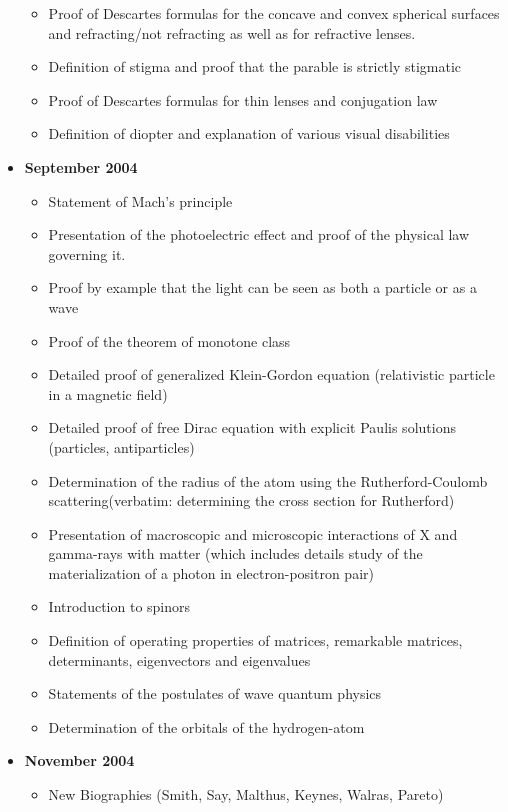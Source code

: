 \documentclass[12pt,a4paper,twoside,openright]{report}
\theoremstyle{definition}
\theoremstyle{itexmp}
\numberwithin{equation}{section}
\begin{document}
\begin{itemize}
\begin{itemize}[noitemsep]
			\item Proof of Descartes formulas for the concave and convex spherical surfaces and refracting/not refracting as well as for refractive lenses.
			\item Definition of stigma and proof that the parable is strictly stigmatic
			\item Proof of Descartes formulas for thin lenses and conjugation law
			\item Definition of diopter and explanation of various visual disabilities
		\end{itemize}
	\item \textbf{September 2004}
		\begin{itemize}[noitemsep]
			\item Statement of Mach's principle
			\item Presentation of the photoelectric effect and proof of the physical law governing it.
			\item Proof by example that the light can be seen as both a particle or as a wave
			\item Proof of the theorem of monotone class
			\item Detailed proof of generalized Klein-Gordon equation (relativistic particle in a magnetic field) 
			\item Detailed proof of free Dirac equation with explicit Paulis solutions (particles, antiparticles)
			\item Determination of the radius of the atom using the Rutherford-Coulomb scattering(verbatim: determining the cross section for Rutherford)
			\item Presentation of macroscopic and microscopic interactions of X and gamma-rays with matter (which includes details study of the materialization of a photon in electron-positron pair)
			\item Introduction to spinors
			\item Definition of operating properties of matrices, remarkable matrices, determinants, eigenvectors and eigenvalues
			\item Statements of the postulates of wave quantum physics
			\item Determination of the orbitals of the hydrogen-atom
		\end{itemize}
	\item \textbf{November 2004}
		\begin{itemize}[noitemsep]
			\item New Biographies (Smith, Say, Malthus, Keynes, Walras, Pareto)

\end{itemize}
\end{itemize}
\end{document}
